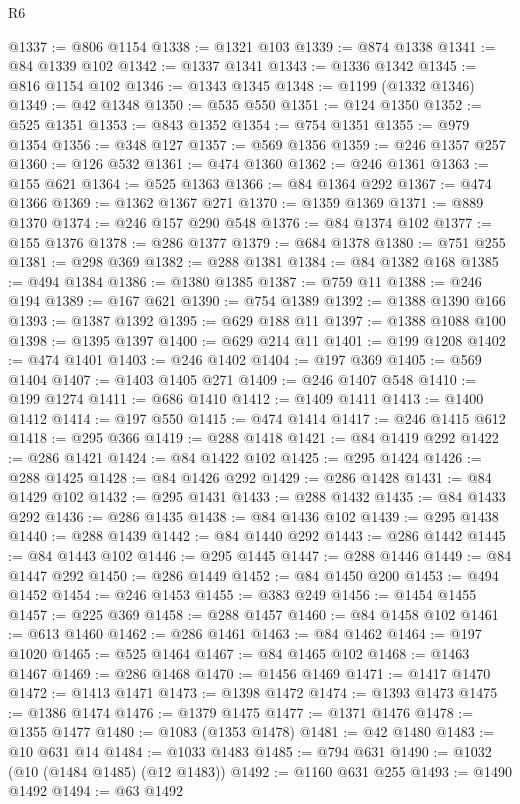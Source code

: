 \begin{lexlean}{R6}
\begin{coremodule}
@1337 := @806 @1154
@1338 := @1321 @103
@1339 := @874 @1338
@1341 := @84 @1339 @102
@1342 := @1337 @1341
@1343 := @1336 @1342
@1345 := @816 @1154 @102
@1346 := @1343 @1345
@1348 := @1199 (@1332 @1346)
@1349 := @42 @1348
@1350 := @535 @550
@1351 := @124 @1350
@1352 := @525 @1351
@1353 := @843 @1352
@1354 := @754 @1351
@1355 := @979 @1354
@1356 := @348 @127
@1357 := @569 @1356
@1359 := @246 @1357 @257
@1360 := @126 @532
@1361 := @474 @1360
@1362 := @246 @1361
@1363 := @155 @621
@1364 := @525 @1363
@1366 := @84 @1364 @292
@1367 := @474 @1366
@1369 := @1362 @1367 @271
@1370 := @1359 @1369
@1371 := @889 @1370
@1374 := @246 @157 @290 @548
@1376 := @84 @1374 @102
@1377 := @155 @1376
@1378 := @286 @1377
@1379 := @684 @1378
@1380 := @751 @255
@1381 := @298 @369
@1382 := @288 @1381
@1384 := @84 @1382 @168
@1385 := @494 @1384
@1386 := @1380 @1385
@1387 := @759 @11
@1388 := @246 @194
@1389 := @167 @621
@1390 := @754 @1389
@1392 := @1388 @1390 @166
@1393 := @1387 @1392
@1395 := @629 @188 @11
@1397 := @1388 @1088 @100
@1398 := @1395 @1397
@1400 := @629 @214 @11
@1401 := @199 @1208
@1402 := @474 @1401
@1403 := @246 @1402
@1404 := @197 @369
@1405 := @569 @1404
@1407 := @1403 @1405 @271
@1409 := @246 @1407 @548
@1410 := @199 @1274
@1411 := @686 @1410
@1412 := @1409 @1411
@1413 := @1400 @1412
@1414 := @197 @550
@1415 := @474 @1414
@1417 := @246 @1415 @612
@1418 := @295 @366
@1419 := @288 @1418
@1421 := @84 @1419 @292
@1422 := @286 @1421
@1424 := @84 @1422 @102
@1425 := @295 @1424
@1426 := @288 @1425
@1428 := @84 @1426 @292
@1429 := @286 @1428
@1431 := @84 @1429 @102
@1432 := @295 @1431
@1433 := @288 @1432
@1435 := @84 @1433 @292
@1436 := @286 @1435
@1438 := @84 @1436 @102
@1439 := @295 @1438
@1440 := @288 @1439
@1442 := @84 @1440 @292
@1443 := @286 @1442
@1445 := @84 @1443 @102
@1446 := @295 @1445
@1447 := @288 @1446
@1449 := @84 @1447 @292
@1450 := @286 @1449
@1452 := @84 @1450 @200
@1453 := @494 @1452
@1454 := @246 @1453
@1455 := @383 @249
@1456 := @1454 @1455
@1457 := @225 @369
@1458 := @288 @1457
@1460 := @84 @1458 @102
@1461 := @613 @1460
@1462 := @286 @1461
@1463 := @84 @1462
@1464 := @197 @1020
@1465 := @525 @1464
@1467 := @84 @1465 @102
@1468 := @1463 @1467
@1469 := @286 @1468
@1470 := @1456 @1469
@1471 := @1417 @1470
@1472 := @1413 @1471
@1473 := @1398 @1472
@1474 := @1393 @1473
@1475 := @1386 @1474
@1476 := @1379 @1475
@1477 := @1371 @1476
@1478 := @1355 @1477
@1480 := @1083 (@1353 @1478)
@1481 := @42 @1480
@1483 := @10 @631 @14
@1484 := @1033 @1483
@1485 := @794 @631
@1490 := @1032 (@10 (@1484 @1485) (@12 @1483))
@1492 := @1160 @631 @255
@1493 := @1490 @1492
@1494 := @63 @1492

\end{coremodule}
\end{lexlean}
